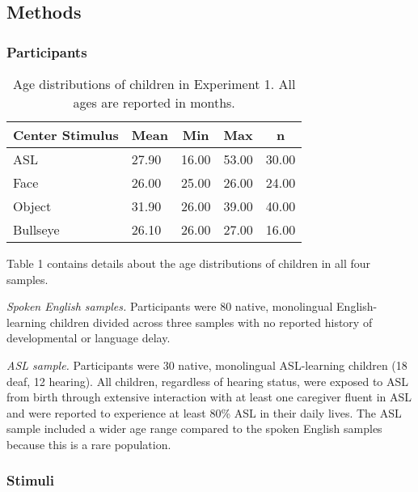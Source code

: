 \documentclass[,man,floatsintext]{apa6}
\begin{document}
\subsection{Methods}\label{methods}

\subsubsection{Participants}\label{participants}

\begin{table}[tbp]
\begin{center}
\begin{threeparttable}
\caption{\label{tab:trio make participants table}Age distributions of children in Experiment 1. All ages are reported in months.}
\begin{tabular}{lllll}
\toprule
Center Stimulus & \multicolumn{1}{c}{Mean} & \multicolumn{1}{c}{Min} & \multicolumn{1}{c}{Max} & \multicolumn{1}{c}{n}\\
\midrule
ASL & 27.90 & 16.00 & 53.00 & 30.00\\
Face & 26.00 & 25.00 & 26.00 & 24.00\\
Object & 31.90 & 26.00 & 39.00 & 40.00\\
Bullseye & 26.10 & 26.00 & 27.00 & 16.00\\
\bottomrule
\end{tabular}
\end{threeparttable}
\end{center}
\end{table}

Table 1 contains details about the age distributions of children in all
four samples.

\emph{Spoken English samples.} Participants were 80 native, monolingual
English-learning children divided across three samples with no reported
history of developmental or language delay.

\emph{ASL sample.} Participants were 30 native, monolingual ASL-learning
children (18 deaf, 12 hearing). All children, regardless of hearing
status, were exposed to ASL from birth through extensive interaction
with at least one caregiver fluent in ASL and were reported to
experience at least 80\% ASL in their daily lives. The ASL sample
included a wider age range compared to the spoken English samples
because this is a rare population.

\subsubsection{Stimuli}\label{stimuli}
\end{document}
